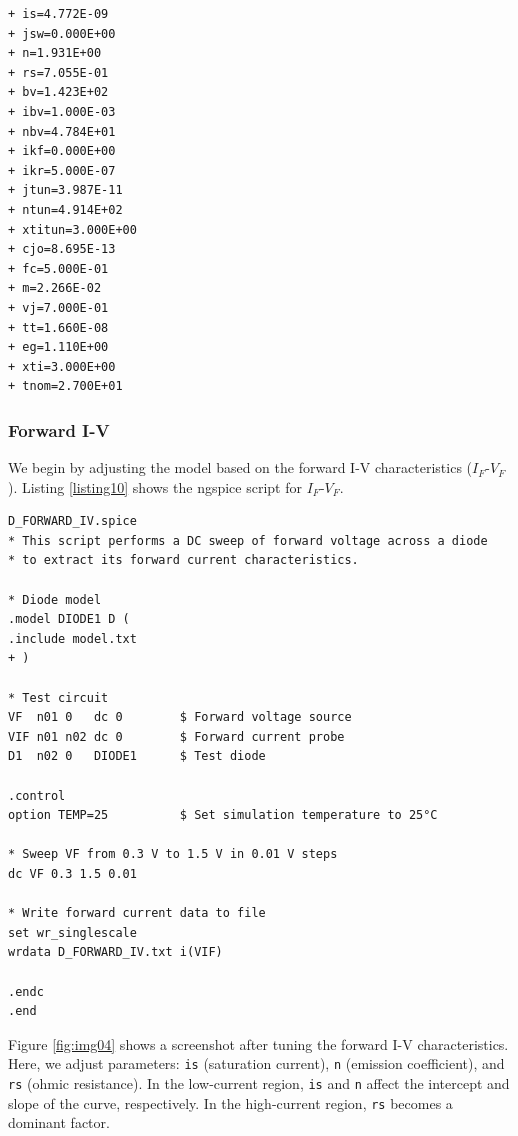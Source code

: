 \documentclass[a4paper,12pt,titlepage]{article}
\begin{document}
\pagebreak

\begin{lstlisting}[label=listing09,caption=model\_final.txt]
+ is=4.772E-09
+ jsw=0.000E+00
+ n=1.931E+00
+ rs=7.055E-01
+ bv=1.423E+02
+ ibv=1.000E-03
+ nbv=4.784E+01
+ ikf=0.000E+00
+ ikr=5.000E-07
+ jtun=3.987E-11
+ ntun=4.914E+02
+ xtitun=3.000E+00
+ cjo=8.695E-13
+ fc=5.000E-01
+ m=2.266E-02
+ vj=7.000E-01
+ tt=1.660E-08
+ eg=1.110E+00
+ xti=3.000E+00
+ tnom=2.700E+01
\end{lstlisting}

\subsubsection{Forward I-V}

We begin by adjusting the model based on the forward I-V characteristics ($I_F$-$V_F$).
Listing \ref{listing10} shows the ngspice script for $I_F$-$V_F$.

\begin{lstlisting}[label=listing10,caption=D\_FORWARD\_IV.spice]
D_FORWARD_IV.spice
* This script performs a DC sweep of forward voltage across a diode
* to extract its forward current characteristics.

* Diode model
.model DIODE1 D (
.include model.txt
+ )

* Test circuit
VF  n01 0   dc 0        $ Forward voltage source
VIF n01 n02 dc 0        $ Forward current probe
D1  n02 0   DIODE1      $ Test diode

.control
option TEMP=25          $ Set simulation temperature to 25°C

* Sweep VF from 0.3 V to 1.5 V in 0.01 V steps
dc VF 0.3 1.5 0.01

* Write forward current data to file
set wr_singlescale
wrdata D_FORWARD_IV.txt i(VIF)

.endc
.end
\end{lstlisting}

Figure \ref{fig:img04} shows a screenshot after tuning the forward I-V characteristics.
Here, we adjust parameters: \texttt{is} (saturation current), \texttt{n} (emission coefficient),
and \texttt{rs} (ohmic resistance). In the low-current region, \texttt{is} and \texttt{n} affect
the intercept and slope of the curve, respectively. In the high-current region, \texttt{rs} becomes
a dominant factor.
\end{document}
